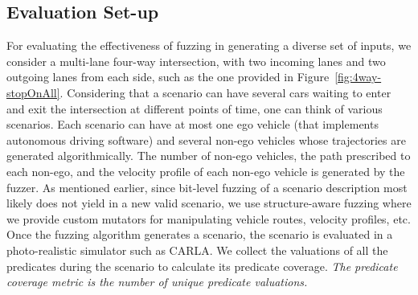 \subsection{Evaluation Set-up}


For evaluating the effectiveness of fuzzing in generating a diverse set of inputs, we consider a multi-lane four-way intersection, with two incoming lanes and two outgoing lanes from each side, such as the one provided in Figure~\ref{fig:4way-stopOnAll}.
% 
Considering that a scenario can have several cars waiting to enter and exit the intersection at different points of time, one can think of various scenarios.
% 
Each scenario can have at most one ego vehicle (that implements autonomous driving software) and several non-ego vehicles whose trajectories are generated algorithmically.
% 
The number of non-ego vehicles, the path prescribed to each non-ego, and the velocity profile of each non-ego vehicle is generated by the fuzzer.
% 
As mentioned earlier, since bit-level fuzzing of a scenario description most likely does not yield in a new valid scenario, we use structure-aware fuzzing where we provide custom mutators for manipulating vehicle routes, velocity profiles, etc.
% 
Once the fuzzing algorithm generates a scenario, the scenario is evaluated in a photo-realistic simulator such as CARLA.
% 
We collect the valuations of all the predicates during the scenario to calculate its predicate coverage.
% 
\emph{The predicate coverage metric is the number of unique predicate valuations.}
% 


